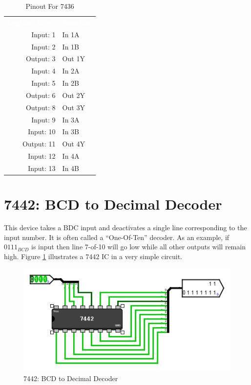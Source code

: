 \begin{table}[H]
	\sffamily
	\newcommand{\head}[1]{\textcolor{white}{\textbf{#1}}}		
	\begin{center}
		\begin{tabular}{rl} 
			\rowcolor{black!75}
			\head{Logisim Label} & \head{Function} \\
			Input: 1   & In 1A  \\
			Input: 2   & In 1B  \\
			Output: 3  & Out 1Y \\
			Input: 4   & In 2A  \\
			Input: 5   & In 2B  \\
			Output: 6  & Out 2Y \\
			Output: 8  & Out 3Y \\
			Input: 9   & In 3A  \\
			Input: 10  & In 3B  \\
			Output: 11 & Out 4Y \\
			Input: 12  & In 4A  \\
			Input: 13  & In 4B  \\
		\end{tabular}
	\end{center}
	\caption{Pinout For 7436}
	\label{tab:50-7436}
\end{table}

\section{7442: BCD to Decimal Decoder}

This device takes a BDC input and deactivates a single line corresponding to the input number. It is often called a ``One-Of-Ten'' decoder. As an example, if $ 0111_{BCD} $ is input then line 7-of-10 will go low while all other outputs will remain high. Figure \ref{fig:app_ttl-7442} illustrates a 7442 \ac{IC} in a very simple circuit.

\begin{figure}[H]
	\centering
	\includegraphics[width=\maxwidth{.95\linewidth}]{gfx/app_ttl-7442}
	\caption{7442: BCD to Decimal Decoder}
	\label{fig:app_ttl-7442}
\end{figure}

